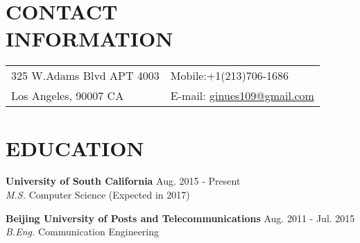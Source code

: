 \documentclass[margin,10pt]{res} %
\begin{document}
\begin{resume}

\section{CONTACT \\ INFORMATION}
\begin{tabular}{ll}
\leftmargini=4mm
325 W.Adams Blvd APT 4003& Mobile:+1(213)706-1686\\
Los Angeles, 90007 CA & E-mail: \href{mailto:ginues109@gmail.com}{ginues109@gmail.com}\\
\end{tabular}





\section{EDUCATION}

{\bf University of South California} \hfill Aug. 2015 - Present \\
{\sl M.S.} Computer Science (Expected in 2017)

{\bf Beijing University of Posts and Telecommunications} \hfill Aug. 2011 - Jul. 2015\\
{\sl B.Eng.} Communication Engineering



\end{resume}
\end{document}
